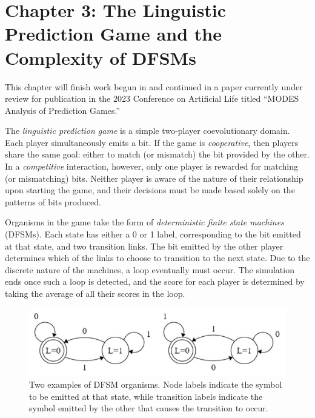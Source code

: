 \documentclass{article}
\begin{document}
\section*{Chapter 3: The Linguistic Prediction Game and the Complexity of DFSMs}

This chapter will finish work begun in \citet{moran2019evolving} and continued in a paper 
currently under review for publication in the 2023 Conference on Artificial Life titled 
``MODES Analysis of Prediction Games.'' 

The \textit{linguistic prediction game} is a simple two-player coevolutionary domain. 
Each player simultaneously emits a bit. If the game is \textit{cooperative}, then players share 
the same goal: either to match (or mismatch) the bit provided by the other. 
In a \textit{competitive} interaction, however, only one player is rewarded for matching 
(or mismatching) bits. Neither player is aware of the nature of their relationship upon starting
the game, and their decisions must be made based solely on the patterns of bits produced.
 
Organisms in the game take the form of \textit{deterministic finite state machines} (DFSMs). 
Each state has either a 0 or 1 label, corresponding to the bit emitted at that state, and two 
transition links. The bit emitted by the other player determines which of the links to choose to 
transition to the next state. Due to the discrete nature of the machines, a loop eventually must 
occur. The simulation ends once such a loop is detected, and the score for each player is 
determined by taking the average of all their scores in the loop.

\begin{figure}[H]
    \begin{center}
        \includegraphics[width=4.5in]{dfsm.png}
        \caption{Two examples of DFSM organisms. Node labels indicate the symbol to be emitted 
        at that state, while transition labels indicate the symbol emitted by the other 
        that causes the transition to occur.}
        \label{dfsm}
    \end{center}
\end{figure}
\end{document}
